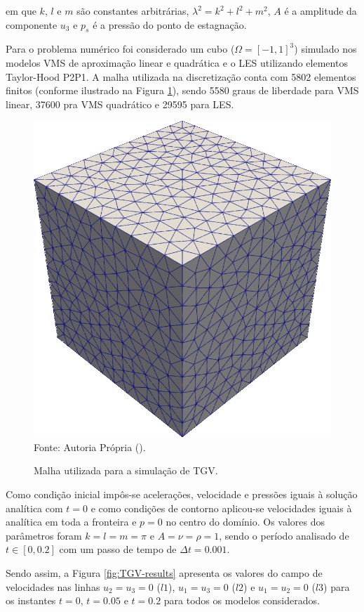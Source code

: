 \noindent em que $k$, $l$ e $m$ são constantes arbitrárias, $\lambda^2=k^2+l^2+m^2$, $A$ é a amplitude da componente $u_3$ e $p_s$ é a pressão do ponto de estagnação.

Para o problema numérico foi considerado um cubo ($\Omega=[-1,1]^3$) simulado nos modelos VMS de aproximação linear e quadrática e o LES utilizando elementos Taylor-Hood P2P1. A malha utilizada na discretização conta com 5802 elementos finitos (conforme ilustrado na Figura \ref{fig:TGV-mesh}), sendo 5580 graus de liberdade para VMS linear, 37600 pra VMS quadrático e 29595 para LES.

\begin{figure}[h]
    \centering
    \caption{Malha utilizada para a simulação de TGV.}
    \includegraphics[width=0.45\linewidth]{Figuras/taylor-green/mesh.png}
    \\Fonte: Autoria Própria (\the\year).
    \label{fig:TGV-mesh}
\end{figure}

Como condição inicial impôs-se acelerações, velocidade e pressões iguais à solução analítica com $t=0$ e como condições de contorno aplicou-se velocidades iguais à analítica em toda a fronteira e $p=0$ no centro do domínio. Os valores dos parâmetros foram $k=l=m=\pi$ e $A=\nu=\rho=1$, sendo o período analisado de $t\in[0,0.2]$ com um passo de tempo de $\Delta t=0.001$.

Sendo assim, a Figura \ref{fig:TGV-results} apresenta os valores do campo de velocidades nas linhas $u_2=u_3=0$ ($l1$), $u_1=u_3=0$ ($l2$) e $u_1=u_2=0$ ($l3$) para os instantes $t=0$, $t=0.05$ e $t=0.2$ para todos os modelos considerados.

